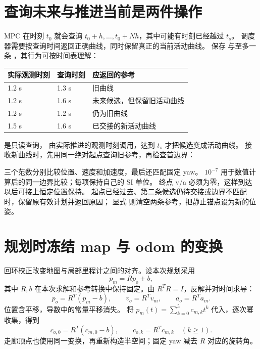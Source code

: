 \section{查询未来与推进当前是两件操作}
MPC 在时刻 $t_0$ 就会查询 $t_0+h,\ldots,t_0+Nh$，其中可能有时刻已经越过 $t_s$。
调度器需要按查询时间返回正确曲线，同时保留真正的当前活动曲线。
 保存  与至多一条 ，其行为可按时间表理解：
\begin{center}\small
\begin{tabular}{lll}\toprule
实际观测时刻 & 查询时刻 & 应返回的参考\\\midrule
1.2 s & 1.3 s & 旧曲线\\
1.2 s & 1.6 s & 未来候选，但保留旧活动曲线\\
1.2 s & 1.2 s & 仍为旧曲线\\
1.5 s & 1.6 s & 已交接的新活动曲线\\\bottomrule
\end{tabular}
\end{center}
 是只读查询， 由实际推进的观测时刻调用，达到 $t_s$ 才把候选变成活动曲线。
接收新曲线时，先用同一绝对起点查询旧参考，再检查首边界：
\par\noindent\begin{minipage}{\linewidth}

\end{minipage}\par
三个范数分别比较位置、速度和加速度，最后还匹配固定 yaw。
$10^{-7}$ 用于数值计算后的同一边界比较；每项保持自己的 SI 单位。
终点 v/a 必须为零，这样到达以后可接上恒定位置保持。
起点已经过去、第二条候选仍待交接或边界不匹配时，保留原有效计划并返回原因；
显式  则清空两条参考，把静止锚点设为新的位姿。

\section{规划时冻结 map 与 odom 的变换}
回环校正改变地图与局部里程计之间的对齐。设本次规划采用
\[
 p_m=Rp_o+b,
\]
其中 $R,b$ 在本次求解和参考转换中保持固定。由 $R^TR=I$，反解并对时间求导：
\begin{equation}
 p_o=R^T(p_m-b),\qquad v_o=R^Tv_m,\qquad a_o=R^Ta_m.\label{eq:navframe}
\end{equation}
位置含平移，导数中的常量平移消失。
将 $p_m(t)=\sum_{k=0}^5c_{m,k}t^k$ 代入，逐次幂收集，得到
\[
 c_{o,0}=R^T(c_{m,0}-b),\qquad c_{o,k}=R^Tc_{m,k}\quad(k\geq1).
\]
走廊顶点也使用同一变换，再重新构造半空间；固定 yaw 减去 $R$ 对应的旋转角。

